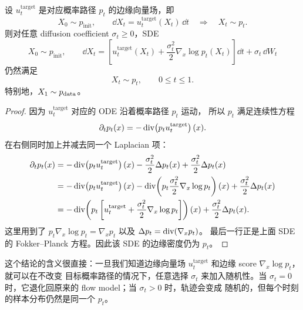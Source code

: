\begin{theorem}
\label{thm:SDE_extension}
设 $u_t^{\mathrm{target}}$ 是对应概率路径 $p_t$ 的边缘向量场，即
\begin{equation}
  X_0\sim p_{\mathrm{init}},
  \qquad
  \dd X_t=u_t^{\mathrm{target}}(X_t)\,\dd t
  \quad\Longrightarrow\quad
  X_t\sim p_t.
\end{equation}
则对任意 diffusion coefficient $\sigma_t\ge 0$，SDE
\begin{equation}
  X_0\sim p_{\mathrm{init}},
  \qquad
  \dd X_t=
  \left[
    u_t^{\mathrm{target}}(X_t)
    +\frac{\sigma_t^2}{2}\nabla_x \log p_t(X_t)
  \right]\dd t
  +\sigma_t\,\dd W_t
\end{equation}
仍然满足
\begin{equation}
  X_t\sim p_t,\qquad 0\le t\le 1.
\end{equation}
特别地，$X_1\sim p_{\mathrm{data}}$。
\end{theorem}

\begin{proof}
因为 $u_t^{\mathrm{target}}$ 对应的 ODE 沿着概率路径 $p_t$ 运动，
所以 $p_t$ 满足连续性方程
\begin{equation}
  \partial_t p_t(x)
  =
  -\operatorname{div}\!\left(p_t u_t^{\mathrm{target}}\right)(x).
\end{equation}
在右侧同时加上并减去同一个 Laplacian 项：
\begin{equation}
\begin{aligned}
  \partial_t p_t(x)
  &=
  -\operatorname{div}\!\left(p_t u_t^{\mathrm{target}}\right)(x)
  -\frac{\sigma_t^2}{2}\Delta p_t(x)
  +\frac{\sigma_t^2}{2}\Delta p_t(x)  \\
  &=
  -\operatorname{div}\!\left(p_t u_t^{\mathrm{target}}\right)(x)
  -\operatorname{div}\!\left(
      p_t \frac{\sigma_t^2}{2}\nabla_x \log p_t
    \right)(x)
  +\frac{\sigma_t^2}{2}\Delta p_t(x)  \\
  &=
  -\operatorname{div}\!\left(
      p_t\left[
        u_t^{\mathrm{target}}
        +\frac{\sigma_t^2}{2}\nabla_x \log p_t
      \right]
    \right)(x)
  +\frac{\sigma_t^2}{2}\Delta p_t(x).
\end{aligned}
\end{equation}
这里用到了
\(
  p_t\nabla_x \log p_t=\nabla_x p_t
\)
以及
\(
  \Delta p_t=\operatorname{div}(\nabla_x p_t)
\)。
最后一行正是上面 SDE 的 Fokker--Planck 方程。因此该 SDE 的边缘密度仍为
$p_t$。
\end{proof}

这个结论的含义很直接：一旦我们知道边缘向量场
$u_t^{\mathrm{target}}$ 和边缘 score $\nabla_x \log p_t$，就可以在不改变
目标概率路径的情况下，任意选择 $\sigma_t$ 来加入随机性。当
$\sigma_t=0$ 时，它退化回原来的 flow model；当 $\sigma_t>0$ 时，轨迹会变成
随机的，但每个时刻的样本分布仍然是同一个 $p_t$。

